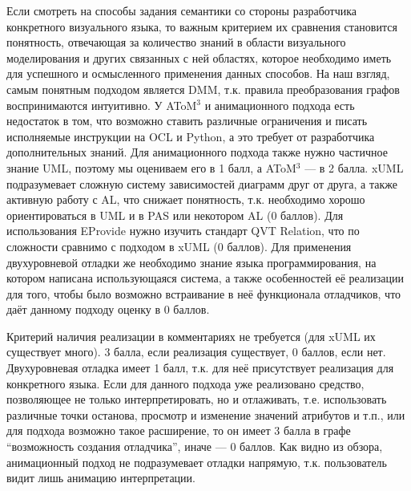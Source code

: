 \documentclass[a5paper]{article}
\begin{document}
Если смотреть на способы задания семантики со стороны разработчика конкретного визуального языка, то важным критерием их сравнения становится понятность, отвечающая за количество знаний в области визуального моделирования и других связанных с ней областях, которое необходимо иметь для успешного и осмысленного применения данных способов. На наш взгляд, самым понятным подходом является DMM, т.к. правила преобразования графов воспринимаются интуитивно. У AToM$^3$ и анимационного подхода есть недостаток в том, что возможно ставить различные ограничения и писать исполняемые инструкции на OCL и Python,  а это требует от разработчика дополнительных знаний. Для анимационного подхода также нужно частичное знание UML, поэтому мы оцениваем его в 1 балл, а AToM$^3$ --- в 2 балла. xUML подразумевает сложную систему зависимостей диаграмм друг от друга, а также активную работу с AL, что снижает понятность, т.к. необходимо хорошо ориентироваться в UML и в PAS или некотором AL (0 баллов). Для использования EProvide нужно изучить стандарт QVT Relation, что по сложности сравнимо с подходом в xUML (0 баллов). Для применения двухуровневой отладки же необходимо знание языка программирования, на котором написана использующаяся система, а также особенностей её реализации для того, чтобы было возможно встраивание в неё функционала отладчиков, что даёт данному подходу оценку в 0 баллов.

Критерий наличия реализации в комментариях не требуется (для xUML их существует много). 3 балла, если реализация существует, 0 баллов, если нет. Двухуровневая отладка имеет 1 балл, т.к. для неё присутствует реализация для конкретного языка. Если для данного подхода уже реализовано средство, позволяющее не только интерпретировать, но и отлаживать, т.е. использовать различные точки останова, просмотр и изменение значений атрибутов и т.п., или для подхода возможно такое расширение, то он имеет 3 балла в графе “возможность создания отладчика”, иначе --- 0 баллов. Как видно из обзора, анимационный подход не подразумевает отладки напрямую, т.к. пользователь видит лишь анимацию интерпретации.
\end{document}
